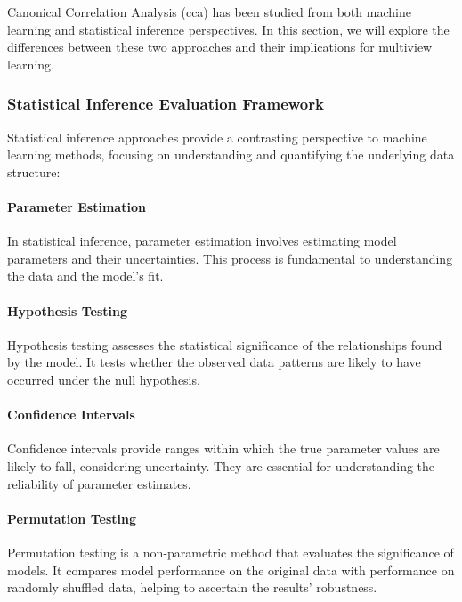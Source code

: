 Canonical Correlation Analysis (\acrshort{cca}) has been studied from both machine learning and statistical inference perspectives.
In this section, we will explore the differences between these two approaches and their implications for multiview learning.

\subsubsection{Statistical Inference Evaluation Framework}

Statistical inference approaches provide a contrasting perspective to machine learning methods, focusing on understanding and quantifying the underlying data structure:

\paragraph{Parameter Estimation}

In statistical inference, parameter estimation involves estimating model parameters and their uncertainties. This process is fundamental to understanding the data and the model's fit.

\paragraph{Hypothesis Testing}

Hypothesis testing assesses the statistical significance of the relationships found by the model. It tests whether the observed data patterns are likely to have occurred under the null hypothesis.

\paragraph{Confidence Intervals}

Confidence intervals provide ranges within which the true parameter values are likely to fall, considering uncertainty. They are essential for understanding the reliability of parameter estimates.

\paragraph{Permutation Testing}

Permutation testing is a non-parametric method that evaluates the significance of models. It compares model performance on the original data with performance on randomly shuffled data, helping to ascertain the results' robustness.

